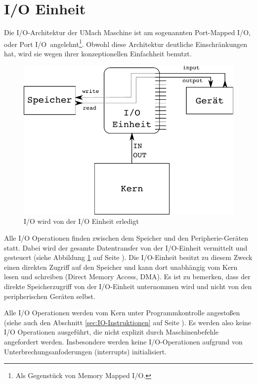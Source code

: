 \section{I/O Einheit}
\label{sec:IO-Einheit}

Die I/O-Architektur der UMach Maschine ist am sogenannten \glqq Port-Mapped
I/O\grqq, oder \glqq Port I/O\grqq\ angelehnt\footnote{Als Gegenstück von \glqq
Memory Mapped I/O\grqq.}. Obwohl diese Architektur deutliche Einschränkungen
hat, wird sie wegen ihrer konzeptionellen Einfachheit benutzt.

\begin{figure}[htp]
 \centering
 \includegraphics{./img/UMach-IO-Prozess.pdf}
 \caption{I/O wird von der I/O Einheit erledigt}
 \label{fig:UMach-IO-Prozess}
\end{figure}

Alle I/O Operationen finden zwischen dem Speicher und den Peripherie-Geräten
statt. Dabei wird der gesamte Datentransfer von der I/O-Einheit vermittelt und
gesteuert (siehe Abbildung \ref{fig:UMach-IO-Prozess} auf Seite
\pageref{fig:UMach-IO-Prozess}). Die I/O-Einheit besitzt zu diesem Zweck einen
direkten Zugriff auf den Speicher und kann dort unabhängig vom Kern lesen und
schreiben (Direct Memory Access, \gls{DMA}). Es ist zu bemerken, dass
der direkte Speicherzugriff von der I/O-Einheit unternommen wird und nicht von
den peripherischen Geräten selbst.

Alle I/O Operationen werden vom Kern unter Programmkontrolle angestoßen (siehe
auch den Abschnitt \ref{sec:IO-Instruktionen} auf Seite
\pageref{sec:IO-Instruktionen}). Es werden also keine I/O Operationen
ausgeführt, die nicht explizit durch Maschinenbefehle angefordert werden.
Insbesondere werden keine I/O-Operationen aufgrund von
Unterbrechungsanfoderungen (interrupts) initialisiert.

